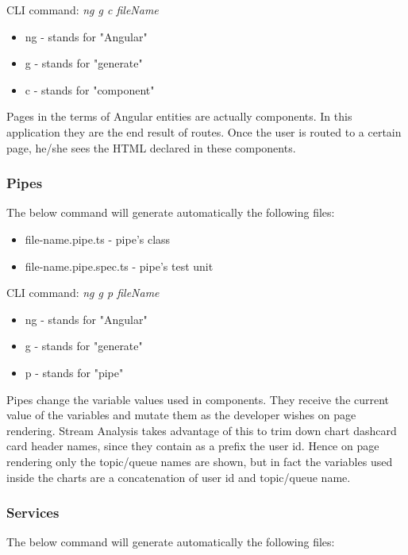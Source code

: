 CLI command: \textit{ng g c fileName}

\begin{itemize}
	\item ng - stands for "Angular"
	\item g - stands for "generate"
	\item c - stands for "component"
\end{itemize}


Pages in the terms of Angular entities are actually components. In this application they are the end result of routes. Once the user is routed to a certain page, he/she sees the HTML declared in these components.

\subsubsection{Pipes}
\label{chap:04:01:02:05}

The below command will generate automatically the following files:

\begin{itemize}
	\item file-name.pipe.ts - pipe's class
	\item file-name.pipe.spec.ts - pipe's test unit
\end{itemize}

CLI command: \textit{ng g p fileName}

\begin{itemize}
	\item ng - stands for "Angular"
	\item g - stands for "generate"
	\item p - stands for "pipe"
\end{itemize}


Pipes change the variable values used in components. They receive the current value of the variables and mutate them as the developer wishes on page rendering. Stream Analysis takes advantage of this to trim down chart dashcard card header names, since they contain as a prefix the user id. Hence on page rendering only the topic/queue names are shown, but in fact the variables used inside the charts are a concatenation of user id and topic/queue name.

\subsubsection{Services}
\label{chap:04:01:02:06}

The below command will generate automatically the following files:

